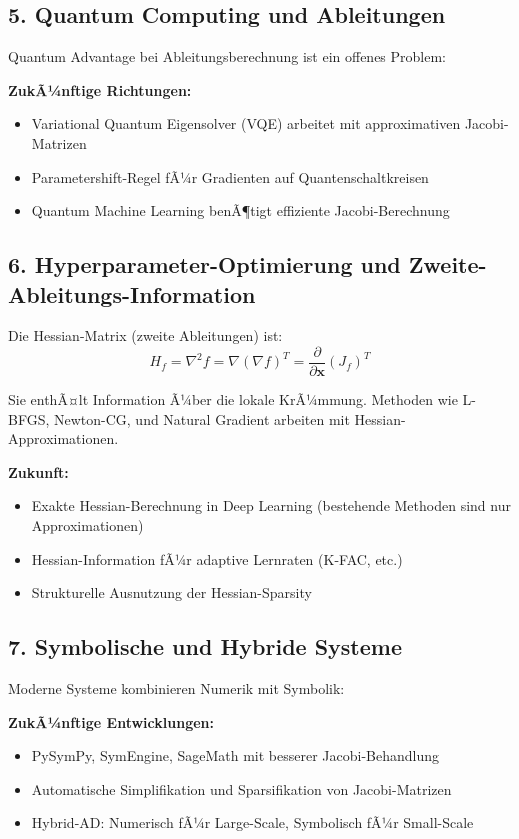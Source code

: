 ﻿\documentclass[a4paper,12pt]{article}
\theoremstyle{definition}
\begin{document}
\subsection{5. Quantum Computing und Ableitungen}

Quantum Advantage bei Ableitungsberechnung ist ein offenes Problem:

\textbf{ZukÃ¼nftige Richtungen:}
\begin{itemize}
	\item Variational Quantum Eigensolver (VQE) arbeitet mit approximativen Jacobi-Matrizen
	\item Parametershift-Regel fÃ¼r Gradienten auf Quantenschaltkreisen
	\item Quantum Machine Learning benÃ¶tigt effiziente Jacobi-Berechnung
\end{itemize}

\subsection{6. Hyperparameter-Optimierung und Zweite-Ableitungs-Information}

Die Hessian-Matrix (zweite Ableitungen) ist:
\[
H_f = \nabla^2 f = \nabla(\nabla f)^T = \frac{\partial}{\partial \boldsymbol{x}}(J_f)^T
\]

Sie enthÃ¤lt Information Ã¼ber die lokale KrÃ¼mmung. Methoden wie L-BFGS, Newton-CG, und Natural Gradient arbeiten mit Hessian-Approximationen.

\textbf{Zukunft:}
\begin{itemize}
	\item Exakte Hessian-Berechnung in Deep Learning (bestehende Methoden sind nur Approximationen)
	\item Hessian-Information fÃ¼r adaptive Lernraten (K-FAC, etc.)
	\item Strukturelle Ausnutzung der Hessian-Sparsity
\end{itemize}

\subsection{7. Symbolische und Hybride Systeme}

Moderne Systeme kombinieren Numerik mit Symbolik:

\textbf{ZukÃ¼nftige Entwicklungen:}
\begin{itemize}
	\item PySymPy, SymEngine, SageMath mit besserer Jacobi-Behandlung
	\item Automatische Simplifikation und Sparsifikation von Jacobi-Matrizen
	\item Hybrid-AD: Numerisch fÃ¼r Large-Scale, Symbolisch fÃ¼r Small-Scale
\end{itemize}
\end{document}
